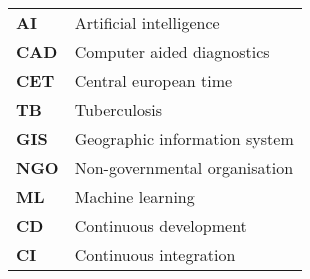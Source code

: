 
\paragraph{}
\hspace {0.1cm} 

\begin{tabular}{>{\raggedright\arraybackslash}p{1cm}>{\raggedright\arraybackslash}p{15cm}}

\textbf{AI} &  Artificial intelligence\\
\textbf{CAD} &  Computer aided diagnostics\\
\textbf{CET} &  Central european time\\
\textbf{TB} &  Tuberculosis\\
\textbf{GIS} &  Geographic information system\\
\textbf{NGO} &  Non-governmental organisation\\
\textbf{ML} &  Machine learning\\
\textbf{CD} &  Continuous development\\
\textbf{CI} &  Continuous integration\\

\end{tabular}
\newline
